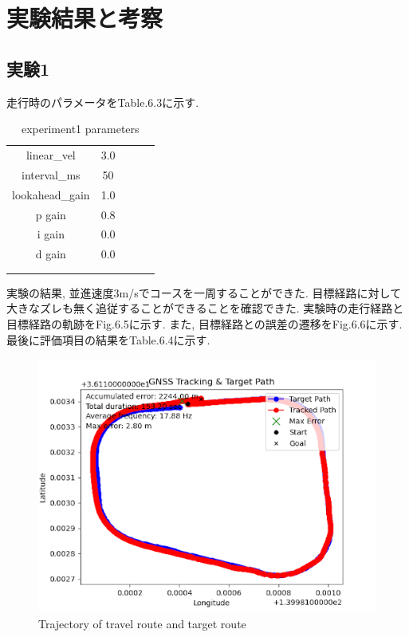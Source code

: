 \newpage

\section{実験結果と考察}

\subsection{実験1}
走行時のパラメータをTable.6.3に示す.
\begin{table}[H]
     \centering
     \caption{experiment1 parameters}
     \begin{tabular}{cclll}
     \multicolumn{1}{c|}{linear\_vel}     & 3.0  &  &  &  \\
     \multicolumn{1}{c|}{interval\_ms}    & 50   &  &  &  \\
     \multicolumn{1}{c|}{lookahead\_gain} & 1.0  &  &  &  \\
     \multicolumn{1}{c|}{p gain}          & 0.8  &  &  &  \\
     \multicolumn{1}{c|}{i gain}          & 0.0  &  &  &  \\
     \multicolumn{1}{c|}{d gain}          & 0.0 &  &  &  \\
     \multicolumn{1}{l}{}                 &      &  &  &  \\
     \multicolumn{1}{l}{}                 &      &  &  & 
     \end{tabular}
\end{table}

実験の結果, 並進速度3m/sでコースを一周することができた.
目標経路に対して大きなズレも無く追従することができることを確認できた.
実験時の走行経路と目標経路の軌跡をFig.6.5に示す.
また, 目標経路との誤差の遷移をFig.6.6に示す.
最後に評価項目の結果をTable.6.4に示す.

\begin{figure}[H]
     \centering
    \includegraphics[keepaspectratio, scale=0.7]
         {images/3mspath.png}
    \caption{Trajectory of travel route and target route}
    \label{fig:path}
\end{figure}

